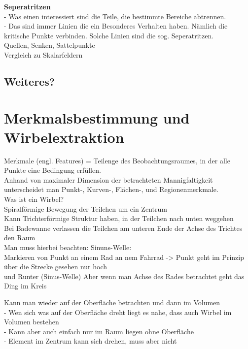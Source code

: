 \documentclass{article}
\begin{document}
\noindent \textbf{Seperatritzen}\\
- Was einen interessiert sind die Teile, die bestimmte Bereiche abtrennen.\\
- Das sind immer Linien die ein Besonderes Verhalten haben. Nämlich die kritische Punkte verbinden. Solche Linien sind die sog. Seperatritzen.\\

\noindent Quellen, Senken, Sattelpunkte\\

\noindent Vergleich zu Skalarfeldern

\subsection{Weiteres?}

\pagebreak
\section{Merkmalsbestimmung und Wirbelextraktion}
Merkmale (engl. Features) = Teilenge des Beobachtungsraumes, in der alle Punkte eine Bedingung erfüllen.\\
Anhand von maximaler Dimension der betrachteten Mannigfaltigkeit unterscheidet man Punkt-, Kurven-, Flächen-, und Regionenmerkmale.\\

\noindent Was  ist ein Wirbel?\\
Spiralförmige Bewegung der Teilchen um ein Zentrum\\
Kann Trichterförmige Struktur haben, in der Teilchen nach unten weggehen\\
Bei Badewanne verlassen die Teilchen am unteren Ende der Achse des Trichtes den Raum\\

\noindent Man muss hierbei beachten: Sinuns-Welle:\\
Markieren von Punkt an einem Rad an nem Fahrrad -> Punkt geht im Prinzip über die Strecke gesehen nur hoch\\ und Runter (Sinus-Welle) Aber wenn man Achse des Rades betrachtet geht das Ding im Kreis

Kann man wieder auf der Oberfläche betrachten und dann im Volumen \\
- Wen sich was auf der Oberfläche dreht liegt es nahe, dass auch Wirbel im Volumen bestehen\\
- Kann aber auch einfach nur im Raum liegen ohne Oberfläche\\
- Element im Zentrum kann sich drehen, muss aber nicht\\
\end{document}
